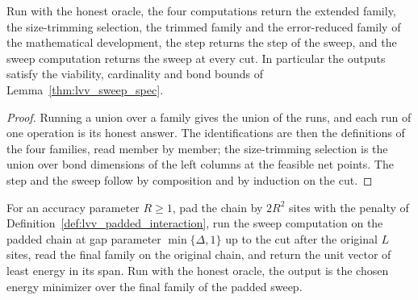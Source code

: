 \begin{lemma}
    \label{thm:lvv_eval_sweep_program}
    \leanok
    Run with the honest oracle, the four computations return the extended
    family, the size-trimming selection, the trimmed family and the
    error-reduced family of the mathematical development, the step returns the
    step of the sweep, and the sweep computation returns the sweep at every
    cut. In particular the outputs satisfy the viability, cardinality and bond
    bounds of Lemma~\ref{thm:lvv_sweep_spec}.
\end{lemma}
\begin{proof}
    \leanok
    Running a union over a family gives the union of the runs, and each run of
    one operation is its honest answer. The identifications are then the
    definitions of the four families, read member by member; the size-trimming
    selection is the union over bond dimensions of the left columns at the
    feasible net points. The step and the sweep follow by composition and by
    induction on the cut.
\end{proof}

\begin{definition}
    \label{def:lvv_ground_state_program}
    \leanok
    For an accuracy parameter $R\ge1$, pad the chain by $2R^2$ sites with the
    penalty of Definition~\ref{def:lvv_padded_interaction}, run the sweep
    computation on the padded chain at gap parameter $\min\{\Delta,1\}$ up to
    the cut after the original $L$ sites, read the final family on the original
    chain, and return the unit vector of least energy in its span. Run with the
    honest oracle, the output is the chosen energy minimizer over the final
    family of the padded sweep.
\end{definition}

